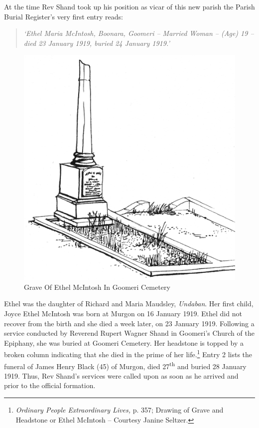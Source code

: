 At the time Rev Shand took up his position as vicar of this new parish the Parish Burial Register's very first entry reads:



\begin{quote}

\emph{`Ethel Maria McIntosh, Boonara, Goomeri -- Married Woman -- (Age) 19 -- died 23 January 1919, buried 24 January 1919.'}

\end{quote}









\begin{figure}
\begin{center}
\includegraphics[width=.7\linewidth,center]{../images/graveOfEthelMcIntoshInGoomeriCemetery.jpg}
\caption{Grave Of Ethel McIntosh In Goomeri Cemetery}
\end{center}
\end{figure}




Ethel was the daughter of Richard and Maria Maudsley, \emph{Undaban}. Her first child, Joyce Ethel McIntosh was born at Murgon on 16 January 1919. Ethel did not recover from the birth and she died a week later, on 23 January 1919. Following a service conducted by Reverend Rupert Wagner Shand in Goomeri's Church of the Epiphany, she was buried at Goomeri Cemetery. Her headstone is topped by a broken column indicating that she died in the prime of her life.\footnote{\emph{Ordinary People Extraordinary Lives,} p. 357; Drawing of Grave and Headstone or Ethel McIntosh -- Courtesy Janine Seltzer.} Entry 2 lists the funeral of James Henry Black (45) of Murgon, died 27\textsuperscript{th} and buried 28 January 1919. Thus, Rev Shand's services were called upon as soon as he arrived and prior to the official formation.


